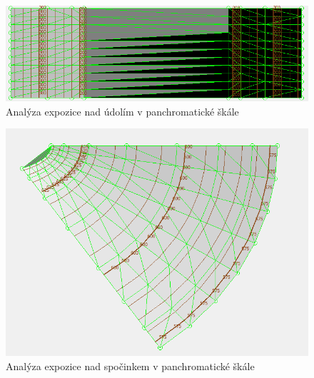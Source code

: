 \documentclass[a4paper,11pt,twoside]{article}
\begin{document}
\vspace{0.2cm}
\begin{figure}[hbt!] 
\begin{center}
\includegraphics[width=13cm]{pictures/valley_panchromatic_aspect.PNG} 
\caption[Analýza expozice nad údolím v panchromatické škále]{Analýza expozice nad údolím v panchromatické škále}
\label{fig:valley_panchromatic_aspect}
\end{center}
\end{figure}

\vspace{0.2cm}
\begin{figure}[hbt!] 
\begin{center}
\includegraphics[width=12cm]{pictures/gentle_ridge_panchromatic_aspect.PNG} 
\caption[Analýza expozice nad spočinkem v panchromatické škále]{Analýza expozice nad spočinkem v panchromatické škále}
\label{fig:gentle_ridge_panchromatic_aspect}
\end{center}
\end{figure}


\newpage
{}
\end{document}
